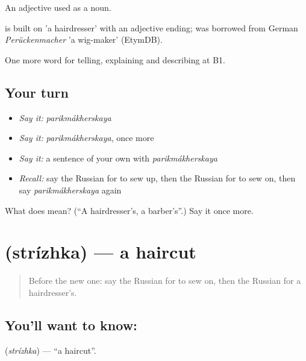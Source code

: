 An adjective used as a noun.

\begin{cousinweb}
\emph{} is built on \emph{} 'a hairdresser' with an adjective ending; \emph{} was borrowed from German \emph{Perückenmacher} 'a wig-maker' (EtymDB).
\end{cousinweb}

\begin{grammarlens}[title={What you've built}]
One more word for telling, explaining and describing at B1.
\end{grammarlens}

\subsection*{Your turn}
\begin{itemize}
\raggedright
  \item \emph{Say it:} \emph{parikmákherskaya}
  \item \emph{Say it:} \emph{parikmákherskaya}, once more
  \item \emph{Say it:} a sentence of your own with \emph{parikmákherskaya}
  \item \emph{Recall:} say the Russian for to sew up, then the Russian for to sew on, then say \emph{parikmákherskaya} again
\end{itemize}

\begin{tcolorbox}[breakable,colback=teal!4,colframe=teal!35!black,title={Before you move on}]
What does  mean? (\textquotedblleft{}A hairdresser's, a barber's\textquotedblright{}.) Say it once more.
\end{tcolorbox}
\section[\texorpdfstring{\ru{стрижка} (strízhka)}{стрижка (strízhka)}]{ (strízhka) — a haircut}

\label{lesson:RU-C449-strizhka}



\begin{quote}
Before the new one: say the Russian for to sew on, then the Russian for a hairdresser's.
\end{quote}

\subsection*{You'll want to know: }
\textbf{} (\emph{strízhka}) — \textquotedblleft{}a haircut\textquotedblright{}.


